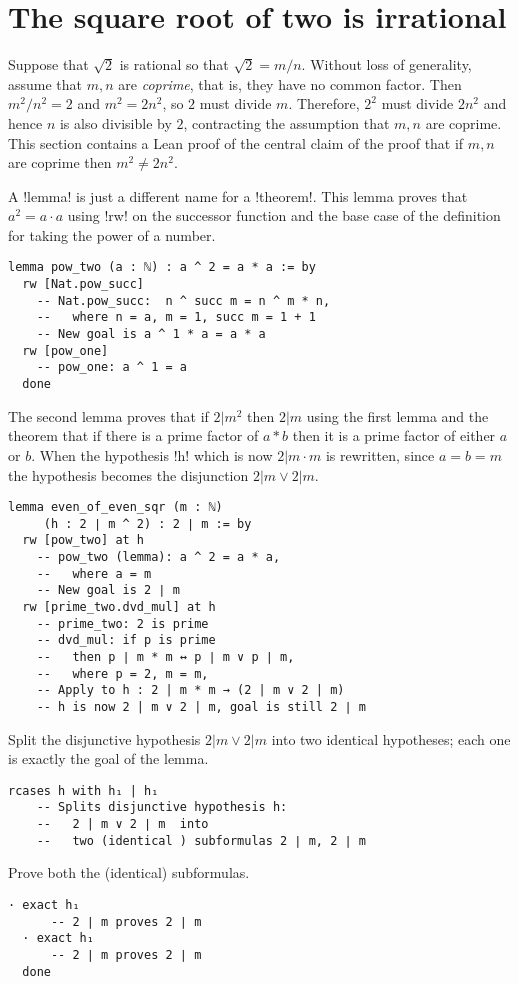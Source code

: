 
\section{The square root of two is irrational}

Suppose that $\sqrt{2}$ is rational so that $\sqrt{2}=m/n$. Without loss of generality, assume that $m,n$ are \emph{coprime}, that is, they have no common factor. Then $m^2/n^2=2$ and $m^2=2n^2$, so $2$ must divide $m$. Therefore, $2^2$ must divide $2n^2$ and hence $n$ is also divisible by $2$, contracting the assumption that $m,n$ are coprime. This section contains a Lean proof of the central claim of the proof that if $m,n$ are coprime then $m^2\neq 2n^2$.

A !lemma! is just a different name for a !theorem!. This lemma proves that $a^2=a\cdot a$ using !rw! on the successor function and the base case of the definition for taking the power of a number.
\begin{Verbatim}
lemma pow_two (a : ℕ) : a ^ 2 = a * a := by
  rw [Nat.pow_succ]
    -- Nat.pow_succ:  n ^ succ m = n ^ m * n,
    --   where n = a, m = 1, succ m = 1 + 1
    -- New goal is a ^ 1 * a = a * a
  rw [pow_one]
    -- pow_one: a ^ 1 = a
  done
\end{Verbatim}

The second lemma proves that if $2 | m^2$ then $2 | m$ using the first lemma and the theorem that if there is a prime factor of $a*b$ then it is a prime factor of either $a$ or $b$. When the hypothesis !h! which is now $2| m \cdot m$ is rewritten, since $a=b=m$ the hypothesis becomes the disjunction $2 | m \vee 2 | m$.
\begin{Verbatim}[firstnumber=last]
lemma even_of_even_sqr (m : ℕ)
     (h : 2 ∣ m ^ 2) : 2 ∣ m := by
  rw [pow_two] at h
    -- pow_two (lemma): a ^ 2 = a * a,
    --   where a = m
    -- New goal is 2 ∣ m
  rw [prime_two.dvd_mul] at h
    -- prime_two: 2 is prime
    -- dvd_mul: if p is prime 
    --   then p ∣ m * m ↔ p ∣ m ∨ p ∣ m,
    --   where p = 2, m = m,
    -- Apply to h : 2 | m * m → (2 | m ∨ 2 | m)
    -- h is now 2 | m ∨ 2 | m, goal is still 2 ∣ m
\end{Verbatim}

Split the disjunctive hypothesis $2 | m \vee 2 | m$ into two identical hypotheses; each one is exactly the goal of the lemma.

\begin{Verbatim}[firstnumber=last]
  rcases h with h₁ | h₁
    -- Splits disjunctive hypothesis h: 
    --   2 | m ∨ 2 ∣ m  into
    --   two (identical ) subformulas 2 ∣ m, 2 ∣ m
\end{Verbatim}
Prove both the (identical) subformulas.
\begin{Verbatim}[firstnumber=last]
  · exact h₁
      -- 2 ∣ m proves 2 ∣ m
  · exact h₁
      -- 2 ∣ m proves 2 ∣ m
  done
\end{Verbatim}

